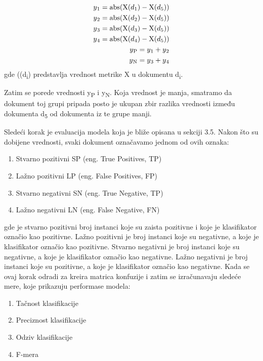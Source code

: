 \documentclass[12pt,oneside]{memoir}
\begin{document}
\begin{align}
	y\textsubscript{1} = \text{abs}(\text{X}(d\textsubscript{1}) - \text{X}(d\textsubscript{5})) \\
	y\textsubscript{2} = \text{abs}(\text{X}(d\textsubscript{2}) - \text{X}(d\textsubscript{5})) \\
	y\textsubscript{3} = \text{abs}(\text{X}(d\textsubscript{3}) - \text{X}(d\textsubscript{5})) \\
	y\textsubscript{4} = \text{abs}(\text{X}(d\textsubscript{4}) - \text{X}(d\textsubscript{5})) \\
	y\textsubscript{P} = y\textsubscript{1} + y\textsubscript{2} \\
	y\textsubscript{N} = y\textsubscript{3} + y\textsubscript{4}
\end{align}
gde ((d\textsubscript{i}) predstavlja vrednost metrike X u dokumentu d\textsubscript{i}.
{\setlength{\parindent}{0cm}
Zatim se porede vrednosti y\textsubscript{P} i y\textsubscript{N}.  Koja vrednost je manja,  smatramo da dokument toj grupi pripada posto je ukupan zbir razlika vrednosti između dokumenta {d\textsubscript{5}} od dokumenta iz te grupe manji.  

Sledeći korak je evaluacija modela koja je bliže opisana u sekciji 3.5. Nakon što su dobijene vrednosti,  svaki dokument označavamo jednom od ovih oznaka:
}
\begin{enumerate}
\item Stvarno pozitivni SP (eng. True Positives, TP)
\item Lažno pozitivni LP (eng.  False Positives,  FP)
\item Stvarno negativni SN (eng.  True Negative, TP)
\item Lažno negativni LN (eng.  False Negative, FN)
\end{enumerate}
{\setlength{\parindent}{0cm}
gde je stvarno pozitivni broj instanci koje su zaista pozitivne i koje je klasifikator označio kao pozitivne.  Lažno pozitivni je broj instanci koje su negativne, a koje je klasifikator označio kao pozitivne.  Stvarno negativni je broj instanci koje su negativne,  a koje je klasifikator označio kao negativne.  Lažno negativni je broj instanci koje su pozitivne, a koje je klasifikator označio kao negativne.  Kada se ovaj korak odradi za kreira matrica konfuzije i zatim se izračunavaju sledeće mere,  koje prikazuju performase modela:
}
\begin{enumerate}
\item Tačnost klasifikacije
\item Preciznost klasifikacije
\item Odziv klasifikacije
\item F-mera
\end{enumerate}
\end{document}
